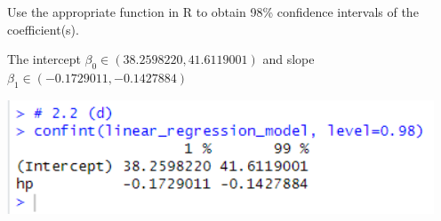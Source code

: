 Use the appropriate function in R to obtain 98\% confidence intervals of the coefficient(s).

\soln* The intercept $\beta_0 \in (38.2598220, 41.6119001)$ and slope $\beta_1 \in (-0.1729011, -0.1427884)$

\nl \includegraphics*[width=5in]{img/2_2d_console.PNG}